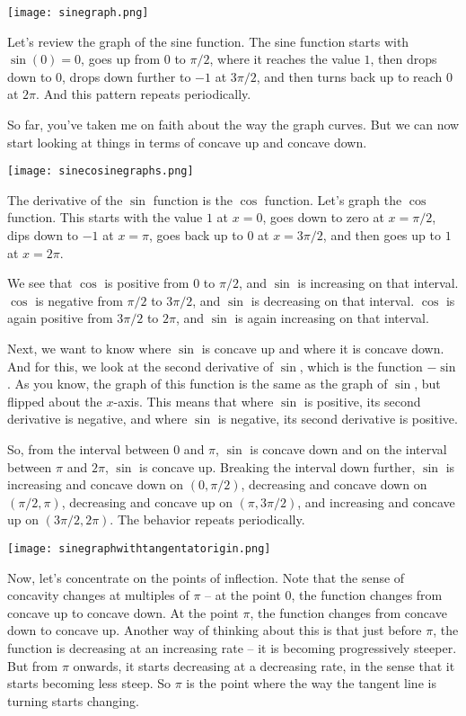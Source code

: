 \documentclass[10pt]{amsart}
\begin{document}
\texttt{[image: sinegraph.png]}

Let's review the graph of the sine function. The sine function starts
with $\sin(0) = 0$, goes up from $0$ to $\pi/2$, where it reaches the
value $1$, then drops down to $0$, drops down further to $-1$ at
$3\pi/2$, and then turns back up to reach $0$ at $2\pi$. And this
pattern repeats periodically.

So far, you've taken me on faith about the way the graph curves. But
we can now start looking at things in terms of concave up and concave
down.

\texttt{[image: sinecosinegraphs.png]}

The derivative of the $\sin$ function is the $\cos$ function. Let's
graph the $\cos$ function. This starts with the value $1$ at $x = 0$,
goes down to zero at $x = \pi/2$, dips down to $-1$ at $x = \pi$, goes
back up to $0$ at $x = 3\pi/2$, and then goes up to $1$ at $x = 2\pi$.

We see that $\cos$ is positive from $0$ to $\pi/2$, and $\sin$ is
increasing on that interval. $\cos$ is negative from $\pi/2$ to
$3\pi/2$, and $\sin$ is decreasing on that interval. $\cos$ is again
positive from $3\pi/2$ to $2\pi$, and $\sin$ is again increasing on
that interval.

Next, we want to know where $\sin$ is concave up and where it is
concave down. And for this, we look at the second derivative of
$\sin$, which is the function $-\sin$. As you know, the graph of this
function is the same as the graph of $\sin$, but flipped about the
$x$-axis. This means that where $\sin$ is positive, its second
derivative is negative, and where $\sin$ is negative, its second
derivative is positive.

So, from the interval between $0$ and $\pi$, $\sin$ is concave down
and on the interval between $\pi$ and $2\pi$, $\sin$ is concave
up. Breaking the interval down further, $\sin$ is increasing and
concave down on $(0,\pi/2)$, decreasing and concave down on
$(\pi/2,\pi)$, decreasing and concave up on $(\pi,3\pi/2)$, and
increasing and concave up on $(3\pi/2,2\pi)$. The behavior repeats
periodically.

\texttt{[image: sinegraphwithtangentatorigin.png]}

Now, let's concentrate on the points of inflection. Note that the
sense of concavity changes at multiples of $\pi$ -- at the point $0$,
the function changes from concave up to concave down. At the point
$\pi$, the function changes from concave down to concave up. Another
way of thinking about this is that just before $\pi$, the function is
decreasing at an increasing rate -- it is becoming progressively
steeper. But from $\pi$ onwards, it starts decreasing at a decreasing
rate, in the sense that it starts becoming less steep. So $\pi$ is the
point where the way the tangent line is turning starts changing.
\end{document}
